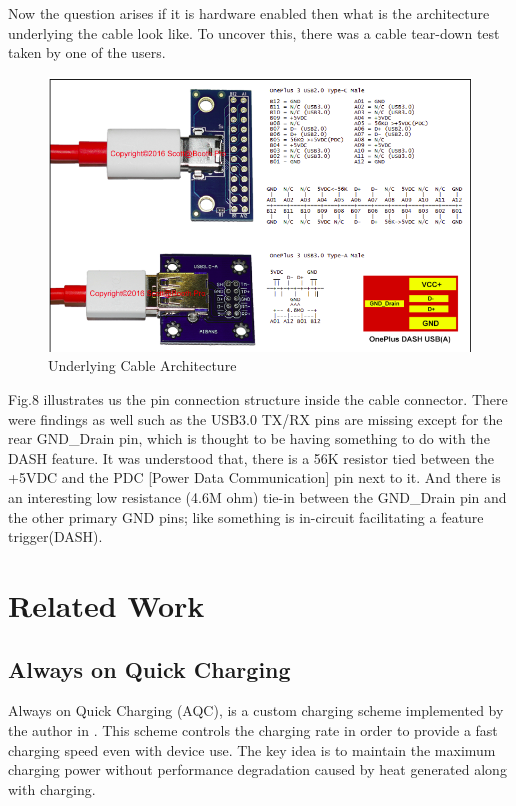 \documentclass[conference]{IEEEtran}
\begin{document}
Now the question arises if it is hardware enabled then what is the architecture underlying the cable look like. To uncover this, there was a cable tear-down test taken by one of the users\cite{b16}.

\begin{figure}[h!]
  \includegraphics[width=\linewidth]{images/image8}
  \caption{Underlying Cable Architecture\cite{b16}}
\end{figure}

Fig.8 illustrates us the pin connection structure inside the cable connector. There were findings as well such as the USB3.0 TX/RX pins are missing except for the rear GND\_Drain pin, which is thought to be having something to do with the DASH feature. It was understood that, there is a 56K resistor tied between the +5VDC and the PDC [Power Data Communication] pin next to it.\cite{b16} And there is an interesting low resistance (4.6M ohm) tie-in between the GND\_Drain pin and the other primary GND pins; like something is in-circuit facilitating a feature trigger(DASH).

\section{Related Work}

\subsection{Always on Quick Charging}

Always on Quick Charging (AQC), is a custom charging scheme implemented by the author in \cite{b1}. This scheme controls the charging rate in order to provide a fast charging speed even with device use. The key idea is to maintain the maximum charging power without performance degradation caused by heat generated along with charging. 
\end{document}
